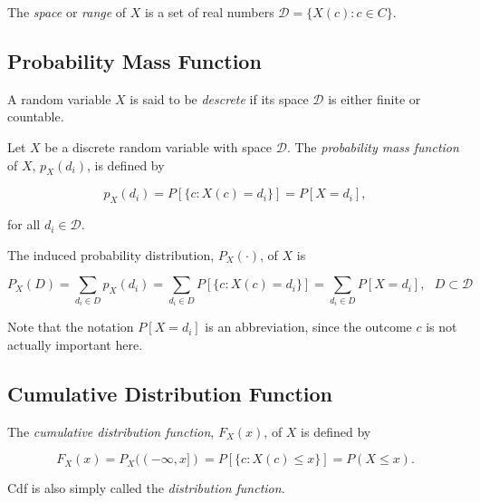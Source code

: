 \documentclass{article}
\begin{document}
            The \textit{space} or \textit{range} of $ X $ is a set of real
            numbers $ \mathcal{D} = \{ X(c): c \in C \} $.

        \subsection{Probability Mass Function}

            A random variable $ X $ is said to be \textit{descrete} if its
            space $ \mathcal{D} $ is either finite or countable.

            Let $ X $ be a discrete random variable with space $ \mathcal{D} $.
            The \textit{probability mass function} of $ X $, $ p_{X}(d_{i}) $,
            is defined by

            \begin{equation*}
                p_{X}(d_{i}) = P[\{ c: X(c) = d_{i} \}] = P[ X = d_{i} ],
            \end{equation*}

            for all $ d_{i} \in \mathcal{D} $.

            The induced probability distribution, $ P_{X}(\cdot) $, of $ X $ is

            \begin{equation*}
                P_{X}(D) = \sum_{ d_{i} \in D} p_{X}(d_{i}) = \sum_{ d_{i} \in
                D} P[\{ c: X(c) = d_{i} \}] = \sum_{d_{i} \in D} P[ X = d_{i}],
                \text{ } D \subset \mathcal{D}
            \end{equation*}

            Note that the notation $ P[ X = d_{i}] $ is an abbreviation, since
            the outcome $ c $ is not actually important here.

        \subsection{Cumulative Distribution Function}

            The \textit{cumulative distribution function}, $ F_{X}(x) $, of $ X
            $ is defined by

            \begin{equation*}
                F_{X}(x) = P_{X}((-\infty, x]) = P[\{ c: X(c) \leq x \}] = P (
                { X \leq x } ).
            \end{equation*}

            Cdf is also simply called the \textit{distribution function}.
\end{document}
